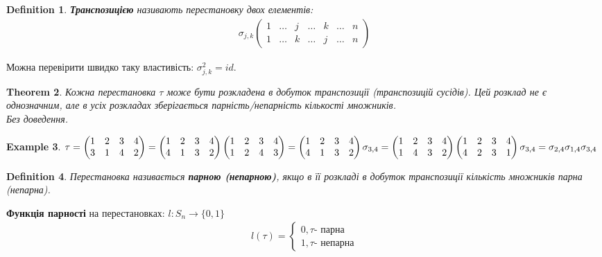 \documentclass[a4paper, 10pt]{article}
\theoremstyle{theoremdd}
\newtheorem{theorem}{Theorem}[subsection]
\newtheorem{definition}[theorem]{Definition}
\newtheorem{example}[theorem]{Example}
\begin{document}
	\begin{definition}
	\textbf{Транспозицією} називають перестановку двох елементів:
	\begin{align*}
	\sigma_{j,k} \begin{pmatrix}
	1 & \dots & j & \dots & k & \dots & n \\
	1 & \dots & k & \dots & j & \dots & n
	\end{pmatrix}
	\end{align*}
	\end{definition}
	\noindent
	Можна перевірити швидко таку властивість: $\sigma_{j,k}^2 = id$.
	
	\begin{theorem} Кожна перестановка $\tau$ може бути розкладена в добуток транспозиції (транспозицій сусідів). Цей розклад не є однозначним, але в усіх розкладах зберігається парність/непарність кількості множників.\\
	\textit{Без доведення.}
	\end{theorem}
	
	\begin{example}
	$\tau = \begin{pmatrix}
	1 & 2 & 3 & 4 \\
	3 & 1 & 4 & 2
	\end{pmatrix} = \begin{pmatrix}
	1 & 2 & 3 & 4 \\
	4 & 1 & 3 & 2
	\end{pmatrix} \begin{pmatrix}
	1 & 2 & 3 & 4 \\
	1 & 2 & 4 & 3
	\end{pmatrix} = \begin{pmatrix}
	1 & 2 & 3 & 4 \\
	4 & 1 & 3 & 2
	\end{pmatrix} \sigma_{3,4} \\ = \begin{pmatrix}
	1 & 2 & 3 & 4 \\
	1 & 4 & 3 & 2
	\end{pmatrix} \begin{pmatrix}
	1 & 2 & 3 & 4 \\
	4 & 2 & 3 & 1
	\end{pmatrix} \sigma_{3,4} = \sigma_{2,4}\sigma_{1,4}\sigma_{3,4}$
	\end{example}

		
	\begin{definition}
	Перестановка називається \textbf{парною (непарною)}, якщо в її розкладі в добуток транспозиції кількість множників парна (непарна).
	\end{definition}
	\noindent
	\textbf{Функція парності} на перестановках: $l: S_n \to \{0,1\}$
	\begin{align*}
	l(\tau) = \begin{cases} 0, \tau \textrm{- парна} \\ 1, \tau \textrm{- непарна} \end{cases}
	\end{align*}
	\fi
	
\end{document}
